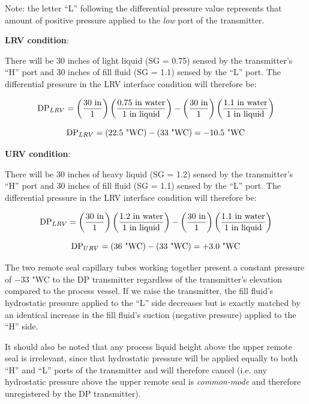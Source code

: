 Note: the letter ``L'' following the differential pressure value represents that amount of positive pressure applied to the {\it low} port of the transmitter.







\noindent
{\bf LRV condition}:

There will be 30 inches of light liquid (SG = 0.75) sensed by the transmitter's ``H'' port and 30 inches of fill fluid (SG = 1.1) sensed by the ``L'' port.  The differential pressure in the LRV interface condition will therefore be:

$$\hbox{DP}_{LRV} = \left(30 \hbox{ in} \over 1 \right) \left(0.75 \hbox{ in water} \over 1 \hbox{ in liquid} \right) - \left(30 \hbox{ in} \over 1 \right) \left(1.1 \hbox{ in water} \over 1 \hbox{ in liquid} \right) $$

$$\hbox{DP}_{LRV} = (22.5 \hbox{ "WC}) - (33 \hbox{ "WC}) = -10.5 \hbox{ "WC}$$

\vskip 10pt

\noindent
{\bf URV condition}:

There will be 30 inches of heavy liquid (SG = 1.2) sensed by the transmitter's ``H'' port and 30 inches of fill fluid (SG = 1.1) sensed by the ``L'' port.  The differential pressure in the LRV interface condition will therefore be:

$$\hbox{DP}_{LRV} = \left(30 \hbox{ in} \over 1 \right) \left(1.2 \hbox{ in water} \over 1 \hbox{ in liquid} \right) - \left(30 \hbox{ in} \over 1 \right) \left(1.1 \hbox{ in water} \over 1 \hbox{ in liquid} \right) $$

$$\hbox{DP}_{URV} = (36 \hbox{ "WC}) - (33 \hbox{ "WC}) = +3.0 \hbox{ "WC}$$


The two remote seal capillary tubes working together present a constant pressure of $-33$ "WC to the DP transmitter regardless of the transmitter's elevation compared to the process vessel.  If we raise the transmitter, the fill fluid's hydrostatic pressure applied to the ``L'' side decreases but is exactly matched by an identical increase in the fill fluid's suction (negative pressure) applied to the ``H'' side.

It should also be noted that any process liquid height above the upper remote seal is irrelevant, since that hydrostatic pressure will be applied equally to both ``H'' and ``L'' ports of the transmitter and will therefore cancel (i.e. any hydrostatic pressure above the upper remote seal is {\it common-mode} and therefore unregistered by the DP transmitter).


